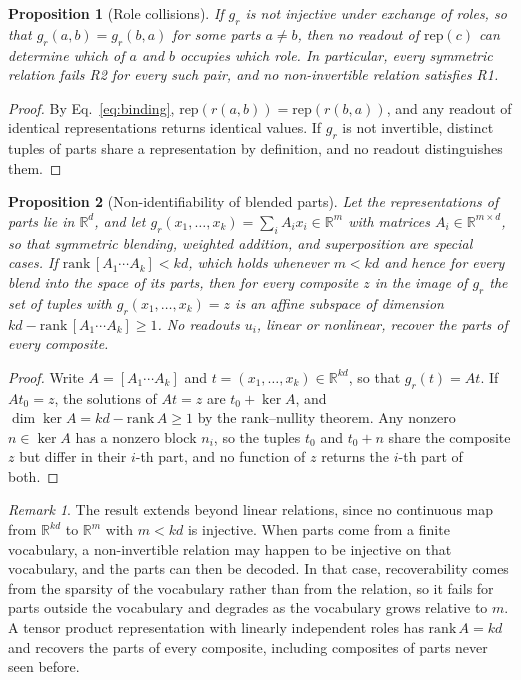 \documentclass{article}
\theoremstyle{definition}
\theoremstyle{plain}
\newtheorem{proposition}{Proposition}
\theoremstyle{remark}
\newtheorem*{remark}{Remark}
\newcommand{\rep}{\mathrm{rep}}
\newcommand{\R}{\mathbb{R}}
\begin{document}
\begin{proposition}[Role collisions]
\label{prop:blend}
If $g_r$ is not injective under exchange of roles, so that $g_r(a, b) = g_r(b, a)$ for some parts $a \neq b$, then no readout of $\rep(c)$ can determine which of $a$ and $b$ occupies which role. In particular, every symmetric relation fails R2 for every such pair, and no non-invertible relation satisfies R1.
\end{proposition}

\begin{proof}
By Eq.~\eqref{eq:binding}, $\rep(r(a, b)) = \rep(r(b, a))$, and any readout of identical representations returns identical values. If $g_r$ is not invertible, distinct tuples of parts share a representation by definition, and no readout distinguishes them.
\end{proof}

\begin{proposition}[Non-identifiability of blended parts]
\label{prop:fiber}
Let the representations of parts lie in $\R^d$, and let $g_r(x_1, \ldots, x_k) = \sum_{i} A_i x_i \in \R^m$ with matrices $A_i \in \R^{m \times d}$, so that symmetric blending, weighted addition, and superposition are special cases. If $\mathrm{rank}\,[A_1 \cdots A_k] < kd$, which holds whenever $m < kd$ and hence for every blend into the space of its parts, then for every composite $z$ in the image of $g_r$ the set of tuples with $g_r(x_1, \ldots, x_k) = z$ is an affine subspace of dimension $kd - \mathrm{rank}\,[A_1 \cdots A_k] \geq 1$. No readouts $u_i$, linear or nonlinear, recover the parts of every composite.
\end{proposition}

\begin{proof}
Write $A = [A_1 \cdots A_k]$ and $t = (x_1, \ldots, x_k) \in \R^{kd}$, so that $g_r(t) = At$. If $At_0 = z$, the solutions of $At = z$ are $t_0 + \ker A$, and $\dim \ker A = kd - \mathrm{rank}\, A \geq 1$ by the rank--nullity theorem. Any nonzero $n \in \ker A$ has a nonzero block $n_i$, so the tuples $t_0$ and $t_0 + n$ share the composite $z$ but differ in their $i$-th part, and no function of $z$ returns the $i$-th part of both.
\end{proof}

\begin{remark}
The result extends beyond linear relations, since no continuous map from $\R^{kd}$ to $\R^m$ with $m < kd$ is injective. When parts come from a finite vocabulary, a non-invertible relation may happen to be injective on that vocabulary, and the parts can then be decoded. In that case, recoverability comes from the sparsity of the vocabulary rather than from the relation, so it fails for parts outside the vocabulary and degrades as the vocabulary grows relative to $m$. A tensor product representation with linearly independent roles has $\mathrm{rank}\, A = kd$ and recovers the parts of every composite, including composites of parts never seen before.
\end{remark}
\end{document}
